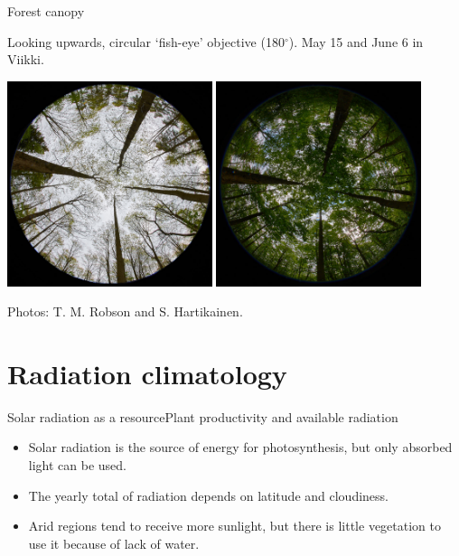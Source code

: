 \documentclass[10pt]{beamer}\usepackage[]{graphicx}\usepackage[]{color}
\begin{document}
\begin{frame}{Forest canopy}

    Looking upwards, circular `fish-eye' objective (180$^\circ$). May 15 and June 6 in Viikki.

    \centering
    \includegraphics[width=0.45\textwidth]{photos/hemis-may-17}\hfil
    \includegraphics[width=0.45\textwidth]{photos/hemis-june-6}

    {\small Photos: T. M. Robson and S. Hartikainen.}
\end{frame}

\section{Radiation climatology}

\begin{frame}{Solar radiation as a resource}{Plant productivity and available radiation}
    \begin{itemize}
        \item Solar radiation is the source of energy for photosynthesis, but only
        absorbed light can be used.
        \item The yearly total of radiation depends on latitude and
        cloudiness.
        \item Arid regions tend to receive more sunlight, but there
        is little vegetation to use it because of lack of water.
    \end{itemize}
\end{frame}
\end{document}
